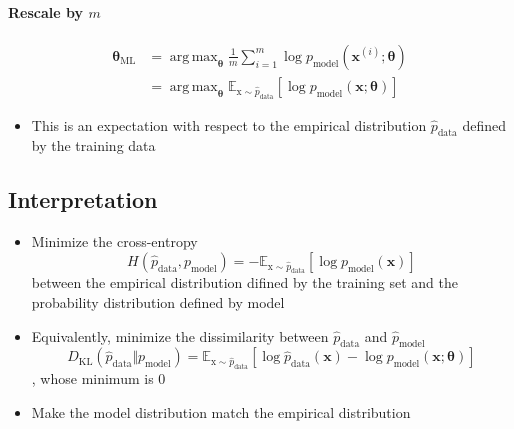 \documentclass[12pt, a4paper]{article}
\def\vx{\boldsymbol{x}}
\def\vtheta{\boldsymbol{\theta}}
\def\vrmx{\boldsymbol{\mathrm{x}}}
\DeclareMathOperator*{\argmax}{arg\,max}
\newcommand{\egvx}[1]{\boldsymbol{x}^{(#1)}}
\newcommand{\expect}[3]{\mathbb{E}_{#1 \sim #2} \left[ #3 \right]}
\newcommand{\dkl}[2]{D_{\mathrm{KL}}(#1 \Vert #2)}
\begin{document}
\paragraph{Rescale by $m$}
\[
    \begin{split}
        \vtheta_{\text{ML}} &= \argmax_{\vtheta} \frac{1}{m} \sum_{i=1}^m \log p_{\text{model}}(\egvx{i};\vtheta) \\ 
        &= \argmax_{\vtheta} \expect{\vrmx}{\hat{p}_{\text{data}}}{\log p_{\text{model}}(\vx;\vtheta)}
    \end{split}
\]
\begin{itemize}
    \item This is an expectation with respect to the empirical distribution $\hat{p}_{\text{data}}$ defined by the training data
\end{itemize}

\subsection{Interpretation}
\begin{itemize}
    \item Minimize the cross-entropy
        \[
            H(\hat{p}_{\text{data}}, p_{\text{model}}) = 
            - \expect{\vrmx}{\hat{p}_{\text{data}}}{\log p_{\text{model}}(\vx)}
        \]
        between the empirical distribution difined by the training set and the probability distribution defined by model
    \item Equivalently, minimize the dissimilarity between $\hat{p}_{\text{data}}$ and $\hat{p}_{\text{model}}$
        \[
            \dkl{\hat{p}_{\text{data}}}{p_{\text{model}}} = \expect{\vrmx}{\hat{p}_{\text{data}}}{\log \hat{p}_{\text{data}}(\vx) - \log p_{\text{model}} (\vx;\vtheta)}
        \]
        , whose minimum is $0$        
    \item Make the model distribution match the empirical distribution
\end{itemize}
\end{document}
